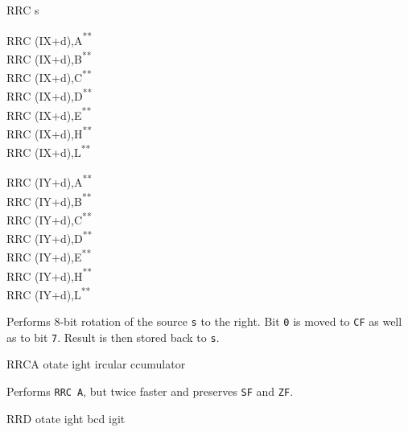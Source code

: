 \documentclass[12pt,twoside,openright,a4paper]{book}
\newcommand{\UNDOC}{\textnormal{\textsuperscript{**}}}
\begin{document}
\begin{basedescript}{
	\desclabelstyle{\multilinelabel}
	\desclabelwidth{3cm}}
\begin{DetailItem}{RRC s}
\begin{DetailVariants}
			\columnbreak
			RRC (IX+d),A\UNDOC\\
			RRC (IX+d),B\UNDOC\\
			RRC (IX+d),C\UNDOC\\
			RRC (IX+d),D\UNDOC\\
			RRC (IX+d),E\UNDOC\\
			RRC (IX+d),H\UNDOC\\
			RRC (IX+d),L\UNDOC

			\columnbreak
			RRC (IY+d),A\UNDOC\\
			RRC (IY+d),B\UNDOC\\
			RRC (IY+d),C\UNDOC\\
			RRC (IY+d),D\UNDOC\\
			RRC (IY+d),E\UNDOC\\
			RRC (IY+d),H\UNDOC\\
			RRC (IY+d),L\UNDOC
		\end{DetailVariants}

		Performs 8-bit rotation of the source {\tt s} to the right. Bit {\tt 0} is moved to {\tt CF} as well as to bit {\tt 7}. Result is then stored back to {\tt s}.

		\begin{DetailEffects}[p]
			\FlagsRRCr
		\end{DetailEffects}
						
		\begin{DetailTiming}
		\end{DetailTiming}

	\end{DetailItem}

	\begin{DetailItem}{RRCA}
		{otate ight ircular ccumulator}
		{\SymRRC{A}}

		Performs {\tt RRC A}, but twice faster and preserves {\tt SF} and {\tt ZF}.

		\begin{DetailEffects}
			\FlagsRRCA
		\end{DetailEffects}
						
		\begin{DetailTiming}
			\DetailTime{}{1}{4}
		\end{DetailTiming}

	\end{DetailItem}

	\pagebreak
	\begin{DetailItem}{RRD}
		{otate ight bcd igit}
		{\SymRRD}
		

\end{DetailItem}
\end{basedescript}
\end{document}
